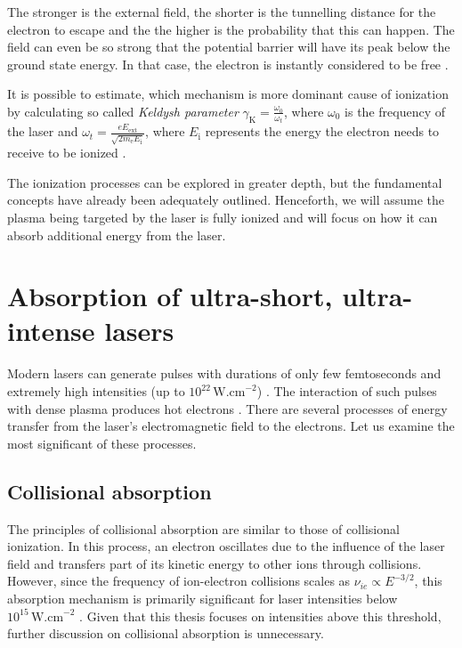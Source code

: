 The stronger is the external field, the shorter is the tunnelling distance for the electron to escape and the the higher is the probability that this can happen. The field can even be so strong that the potential barrier will have its peak below the ground state energy. In that case, the electron is instantly considered to be free \cite{laser-plasma1}. 

It is possible to estimate, which mechanism is more dominant cause of ionization by calculating so called \textit{Keldysh parameter} $\gamma_\mathrm{K} = \frac{\omega_0}{\omega_t}$, where $\omega_0$ is the frequency of the laser and $\omega_t = \frac{eE_{\mathrm{ext}}}{\sqrt{2m_{\mathrm{e}}E_\mathrm{i}}}$, where $E_\mathrm{i}$ represents the energy the electron needs to receive to be ionized \cite{laser-plasma1}.

The ionization processes can be explored in greater depth, but the fundamental concepts have already been adequately outlined. Henceforth, we will assume the plasma being targeted by the laser is fully ionized and will focus on how it can absorb additional energy from the laser.

\section{Absorption of ultra-short, ultra-intense lasers}
Modern lasers can generate pulses with durations of only few femtoseconds and extremely high intensities (up to 
$10^{22}\,\mathrm{W.cm}^{-2}$) \cite{absorption2,ultra-laser}. The interaction of such pulses with dense plasma produces hot electrons \cite{laser-plasma5}. There are several processes of energy transfer from the laser's electromagnetic field to the electrons. Let us examine the most significant of these processes.

\subsection*{Collisional absorption}
The principles of collisional absorption are similar to those of collisional ionization. In this process, an electron oscillates due to the influence of the laser field and transfers part of its kinetic energy to other ions through collisions. However, since the frequency of ion-electron collisions scales as $\nu_{ie} \propto E^{-3/2}$, this absorption mechanism is primarily significant for laser intensities below $10^{15}\,\mathrm{W.cm}^{-2}$ \cite{absorption1}. Given that this thesis focuses on intensities above this threshold, further discussion on collisional absorption is unnecessary.

